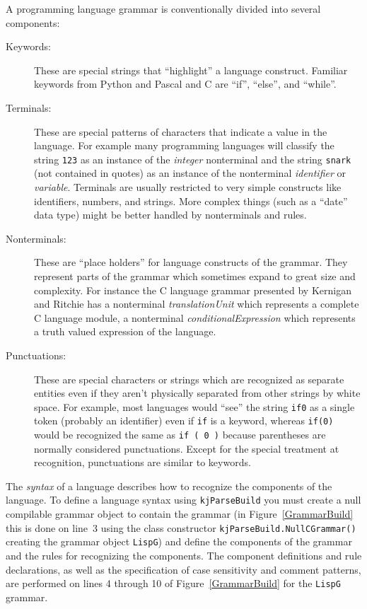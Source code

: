 A programming language grammar is conventionally divided into
several components:
\begin{description}
\item[Keywords:]
These are special strings that ``highlight'' a language construct.
Familiar keywords from Python and Pascal and C are ``if'', ``else'',
and ``while''.
\item[Terminals:]
These are special patterns of characters that indicate a value
in the language.  For example many programming languages will
classify the string {\tt 123} as an instance of the {\em integer}
nonterminal and the string {\tt snark} (not contained in quotes)
as an instance of the nonterminal {\em identifier} or
{\em variable}.  Terminals are usually restricted to very simple
constructs like identifiers, numbers, and strings.  More complex
things (such as a ``date'' data type) might be better handled
by nonterminals and rules.
\item[Nonterminals:]
These are ``place holders'' for language constructs of the
grammar.  They represent parts of the grammar which sometimes
expand to great size and complexity.  For instance the
C language grammar presented by Kernigan and Ritchie has
a nonterminal {\em translationUnit} which represents a
complete C language module, a nonterminal 
{\em conditionalExpression} which represents a truth valued
expression of the language.
\item[Punctuations:]
These are special characters or strings which are recognized
as separate entities even if they aren't physically separated
from other strings by white space.  For example, most languages
would ``see'' the string {\tt if0} as a single token
(probably an identifier) even if {\tt if} is a keyword,
whereas {\tt if(0)} would be recognized
the same as {\tt if ( 0 )} because parentheses are normally
considered punctuations.  Except for the special treatment
at recognition, punctuations are similar to keywords.
\end{description}
The {\em syntax} of a language describes how to recognize
the components of the language.  To define a language syntax using
{\tt kjParseBuild} you must create a null compilable grammar object
to contain the grammar (in Figure~\ref{GrammarBuild} this
is done on line~3 using the class constructor
{\tt kjParseBuild.NullCGrammar()}
creating the grammar object {\tt LispG}) and define the components
of the grammar and the rules for recognizing the components.
The component definitions
and rule declarations, as well as the specification of case sensitivity
and comment patterns, are performed on lines 4 through 10 of
Figure~\ref{GrammarBuild} for the {\tt LispG} grammar.

